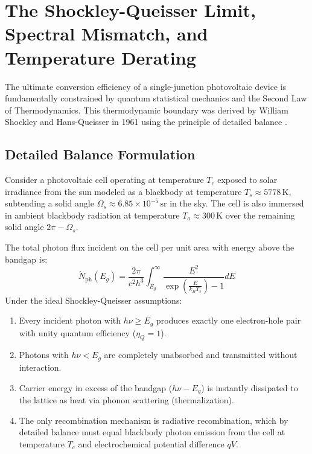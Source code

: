 \section{The Shockley-Queisser Limit, Spectral Mismatch, and Temperature Derating}

The ultimate conversion efficiency of a single-junction photovoltaic device is fundamentally constrained by quantum statistical mechanics and the Second Law of Thermodynamics. This thermodynamic boundary was derived by William Shockley and Hans-Queisser in 1961 using the principle of detailed balance \cite{shockley1961detailed}.

\subsection{Detailed Balance Formulation}

Consider a photovoltaic cell operating at temperature $T_c$ exposed to solar irradiance from the sun modeled as a blackbody at temperature $T_s \approx 5778\,\mathrm{K}$, subtending a solid angle $\Omega_s \approx 6.85 \times 10^{-5}\,\mathrm{sr}$ in the sky. The cell is also immersed in ambient blackbody radiation at temperature $T_a \approx 300\,\mathrm{K}$ over the remaining solid angle $2\pi - \Omega_s$.

The total photon flux incident on the cell per unit area with energy above the bandgap is:
\begin{equation}
\dot{N}_{\mathrm{ph}}(E_g) = \frac{2\pi}{c^2 h^3} \int_{E_g}^{\infty} \frac{E^2}{\exp\left(\frac{E}{k_B T_s}\right) - 1} dE
\label{eq:incident_photon_flux}
\end{equation}
Under the ideal Shockley-Queisser assumptions:
\begin{enumerate}
    \item Every incident photon with $h\nu \ge E_g$ produces exactly one electron-hole pair with unity quantum efficiency ($\eta_Q = 1$).
    \item Photons with $h\nu < E_g$ are completely unabsorbed and transmitted without interaction.
    \item Carrier energy in excess of the bandgap ($h\nu - E_g$) is instantly dissipated to the lattice as heat via phonon scattering (thermalization).
    \item The only recombination mechanism is radiative recombination, which by detailed balance must equal blackbody photon emission from the cell at temperature $T_c$ and electrochemical potential difference $qV$.
\end{enumerate}

